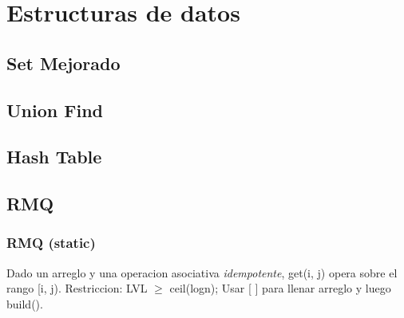 \section{Estructuras de datos}

\subsection{Set Mejorado}


\subsection{Union Find}
% 
% 


\subsection{Hash Table}


\subsection{RMQ}
\subsubsection{RMQ (static)}
Dado un arreglo y una operacion asociativa \emph{idempotente}, get(i, j) opera sobre el rango [i, j). Restriccion: LVL $\ge$ ceil(logn); Usar [ ] para llenar arreglo y luego build().

